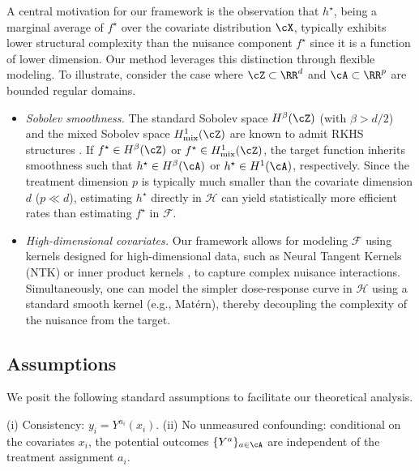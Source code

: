 \documentclass[english,11pt]{article}
\begin{document}
A central motivation for our framework is the observation that $h^\star$, being a marginal average of $f^\star$ over the covariate distribution $\cX$, typically exhibits lower structural complexity than the nuisance component $f^\star$ since it is a function of lower dimension.
Our method leverages this distinction through flexible modeling. To illustrate, consider the case where $\cZ \subset \RR^d$ and $\cA \subset \RR^p$ are bounded regular domains.

\begin{itemize}
    \item \textit{Sobolev smoothness.} The standard Sobolev space $H^\beta(\cZ)$ (with $\beta > d / 2$) and the mixed Sobolev space $H^1_{\mathrm{mix}}(\cZ)$ are known to admit RKHS structures \citep{doumeche2025fast,zhang2023optimality,dick2007construction,kuhn2015approximation,suzuki2018adaptivity}.
    If $f^\star \in H^\beta(\cZ)$ or $f^{\star} \in H^1_{\mathrm{mix}}(\cZ)$, the target function inherits smoothness such that $h^\star \in H^\beta(\cA)$ or $h^\star \in H^1(\cA)$, respectively.
    Since the treatment dimension $p$ is typically much smaller than the covariate dimension $d$ ($p \ll d$), estimating $h^\star$ directly in $\mathcal{H}$ can yield statistically more efficient rates than estimating $f^\star$ in $\mathcal{F}$.

    \item \textit{High-dimensional covariates.} 
    Our framework allows for modeling $\mathcal{F}$ using kernels designed for high-dimensional data, such as Neural Tangent Kernels (NTK) \citep{ghorbani2021linearized,bietti2020deep} or inner product kernels \citep{mei2022generalization,liang2020just,mei2021learning}, to capture complex nuisance interactions.
    Simultaneously, one can model the simpler dose-response curve in $\mathcal{H}$ using a standard smooth kernel (e.g., Matérn), thereby decoupling the complexity of the nuisance from the target.
\end{itemize}


\subsection{Assumptions}

We posit the following standard assumptions to facilitate our theoretical analysis.

\begin{assumption}[Identification]\label{ass:id}
    (i) Consistency: $y_i = Y^{a_i} (x_i)$. (ii) No unmeasured confounding: conditional on the covariates $x_i$, the potential outcomes $\{Y^a\}_{a \in \cA}$ are independent of the treatment assignment $a_i$.
\end{assumption}
\end{document}
